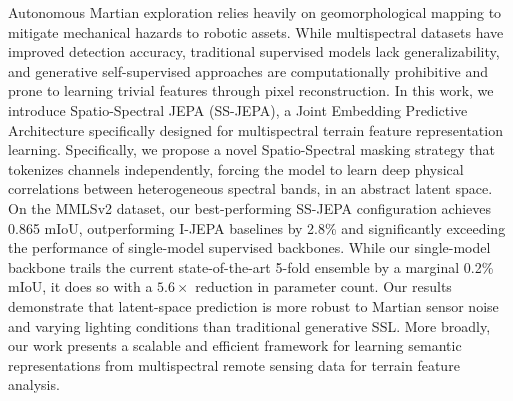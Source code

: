 Autonomous Martian exploration relies heavily on geomorphological mapping to mitigate mechanical hazards to robotic assets. While multispectral datasets have improved detection accuracy, traditional supervised models lack generalizability, and generative self-supervised approaches are computationally prohibitive and prone to learning trivial features through pixel reconstruction. In this work, we introduce Spatio-Spectral JEPA (SS-JEPA), a Joint Embedding Predictive Architecture specifically designed for multispectral terrain feature representation learning. Specifically, we propose a novel Spatio-Spectral masking strategy that tokenizes channels independently, forcing the model to learn deep physical correlations between heterogeneous spectral bands, in an abstract latent space. On the MMLSv2 dataset, our best-performing SS-JEPA configuration achieves 0.865 mIoU, outperforming I-JEPA baselines by 2.8\% and significantly exceeding the performance of single-model supervised backbones. While our single-model backbone trails the current state-of-the-art 5-fold ensemble by a marginal 0.2\% mIoU, it does so with a \( 5.6 \times \) reduction in parameter count. Our results demonstrate that latent-space prediction is more robust to Martian sensor noise and varying lighting conditions than traditional generative SSL. More broadly, our work presents a scalable and efficient framework for learning semantic representations from multispectral remote sensing data for terrain feature analysis.
